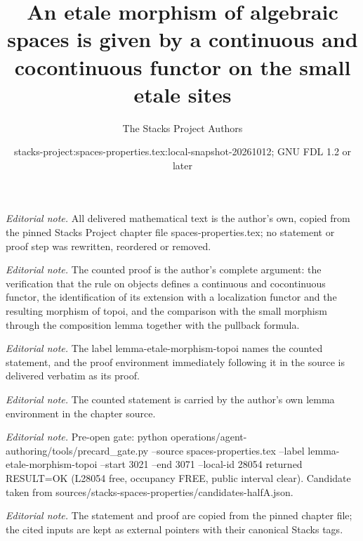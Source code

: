 \documentclass[10pt,a4paper]{amsart}
\title{An etale morphism of algebraic spaces is given by a continuous and cocontinuous functor on the small etale sites}
\author{The Stacks Project Authors}
\date{stacks-project:spaces-properties.tex:local-snapshot-20261012; GNU FDL 1.2 or later}
\theoremstyle{plain}
\theoremstyle{definition}
\theoremstyle{remark}
\numberwithin{equation}{subsection}
\begin{document}
\maketitle
\noindent\textit{Editorial note.} All delivered mathematical text is the author's own, copied from the pinned Stacks Project chapter file spaces-properties.tex; no statement or proof step was rewritten, reordered or removed.\par\medskip
\noindent\textit{Editorial note.} The counted proof is the author's complete argument: the verification that the rule on objects defines a continuous and cocontinuous functor, the identification of its extension with a localization functor and the resulting morphism of topoi, and the comparison with the small morphism through the composition lemma together with the pullback formula.\par\medskip
\noindent\textit{Editorial note.} The label lemma-etale-morphism-topoi names the counted statement, and the proof environment immediately following it in the source is delivered verbatim as its proof.\par\medskip
\noindent\textit{Editorial note.} The counted statement is carried by the author's own lemma environment in the chapter source.\par\medskip
\noindent\textit{Editorial note.} Pre-open gate: python operations/agent-authoring/tools/precard\_gate.py --source spaces-properties.tex --label lemma-etale-morphism-topoi --start 3021 --end 3071 --local-id 28054 returned RESULT=OK (L28054 free, occupancy FREE, public interval clear). Candidate taken from sources/stacks-spaces-properties/candidates-halfA.json.\par\medskip
\noindent\textit{Editorial note.} The statement and proof are copied from the pinned chapter file; the cited inputs are kept as external pointers with their canonical Stacks tags.\par\medskip
\end{document}
